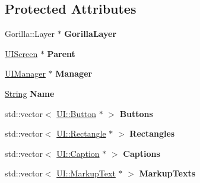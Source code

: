 \subsection*{Protected Attributes}
\begin{DoxyCompactItemize}
\item 
\hypertarget{classphys_1_1UILayer_ac1cfdc64e509e8bf94b10844655ebb6c}{
Gorilla::Layer $\ast$ {\bfseries GorillaLayer}}
\label{da/d48/classphys_1_1UILayer_ac1cfdc64e509e8bf94b10844655ebb6c}

\item 
\hypertarget{classphys_1_1UILayer_aadfee5b1ccbbf76a582b20c0171826ef}{
\hyperlink{classphys_1_1UIScreen}{UIScreen} $\ast$ {\bfseries Parent}}
\label{da/d48/classphys_1_1UILayer_aadfee5b1ccbbf76a582b20c0171826ef}

\item 
\hypertarget{classphys_1_1UILayer_aa6c5cb17111c680c1af20d734dd0a3d7}{
\hyperlink{classphys_1_1UIManager}{UIManager} $\ast$ {\bfseries Manager}}
\label{da/d48/classphys_1_1UILayer_aa6c5cb17111c680c1af20d734dd0a3d7}

\item 
\hypertarget{classphys_1_1UILayer_a26df3b08c7bdcb07eeb9f0633c8d2df8}{
\hyperlink{namespacephys_aa03900411993de7fbfec4789bc1d392e}{String} {\bfseries Name}}
\label{da/d48/classphys_1_1UILayer_a26df3b08c7bdcb07eeb9f0633c8d2df8}

\item 
\hypertarget{classphys_1_1UILayer_ae2a7d6dfb30eff9bec40b6a1a208dae3}{
std::vector$<$ \hyperlink{classphys_1_1UI_1_1Button}{UI::Button} $\ast$ $>$ {\bfseries Buttons}}
\label{da/d48/classphys_1_1UILayer_ae2a7d6dfb30eff9bec40b6a1a208dae3}

\item 
\hypertarget{classphys_1_1UILayer_a5b08f8ae240427c00bba64e544f6d8dd}{
std::vector$<$ \hyperlink{classphys_1_1UI_1_1Rectangle}{UI::Rectangle} $\ast$ $>$ {\bfseries Rectangles}}
\label{da/d48/classphys_1_1UILayer_a5b08f8ae240427c00bba64e544f6d8dd}

\item 
\hypertarget{classphys_1_1UILayer_aa895120d4197d7e255bb6db2eaaa84d7}{
std::vector$<$ \hyperlink{classphys_1_1UI_1_1Caption}{UI::Caption} $\ast$ $>$ {\bfseries Captions}}
\label{da/d48/classphys_1_1UILayer_aa895120d4197d7e255bb6db2eaaa84d7}

\item 
\hypertarget{classphys_1_1UILayer_a3b9913fb2f4142d3d52c899b4347b843}{
std::vector$<$ \hyperlink{classphys_1_1UI_1_1MarkupText}{UI::MarkupText} $\ast$ $>$ {\bfseries MarkupTexts}}
\label{da/d48/classphys_1_1UILayer_a3b9913fb2f4142d3d52c899b4347b843}


\end{DoxyCompactItemize}
